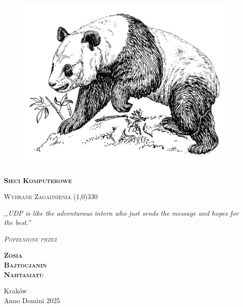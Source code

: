 \begin{titlepage}
	\begin{center}
		\begin{figure}[h]
			\centering
			\includegraphics[scale=1.5]{img/panda.png}
		\end{figure}

		\Huge
		\textbf{\textsc{Sieci Komputerowe}}

		\vspace{0.5cm}
		\Large
		\textsc{Wybrane Zagadnienia}
		\line(1,0){330}

		\normalsize

		\vspace{1cm}
		\textit{,,UDP is like the adventurous intern who just sends the message and hopes for the best.''}
		\vspace{1cm}

		\textit{\textsc{Popełnione przez}}\\
		\vspace{5mm}

		\textbf{\textsc{Zosia \\ Bajtocjanin \\ Nahtamatu}}

		\vfill

		Kraków \\
		Anno Domini 2025
	\end{center}
\end{titlepage}
